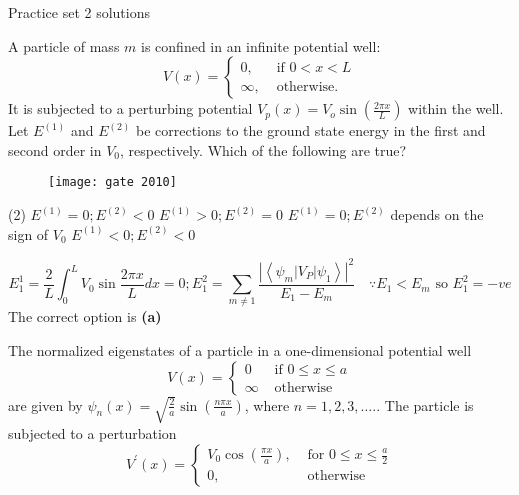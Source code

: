 \newpage
\begin{abox}
	Practice set 2 solutions
	\end{abox}
\begin{enumerate}
	\begin{minipage}{\textwidth}
		\item A particle of mass $m$ is confined in an infinite potential well:
		$$
		V(x)= \begin{cases}0, & \text { if } 0<x<L \\ \infty, & \text { otherwise. }\end{cases}
		$$
		It is subjected to a perturbing potential $V_{p}(x)=V_{o} \sin \left(\frac{2 \pi x}{L}\right)$ within the well. Let $E^{(1)}$ and $E^{(2)}$ be corrections to the ground state energy in the first and second order in $V_{0}$, respectively. Which of the following are true?
		\begin{figure}[H]
			\centering
			\texttt{[image: gate 2010]}
		\end{figure}
	\end{minipage}
	\begin{tasks}(2)
		\task[\textbf{A.}]$E^{(1)}=0 ; E^{(2)}<0$
		\task[\textbf{B.}]$E^{(1)}>0 ; E^{(2)}=0$
		\task[\textbf{C.}]$E^{(1)}=0 ; E^{(2)}$ depends on the sign of $V_{0}$
		\task[\textbf{D.}]$E^{(1)}<0 ; E^{(2)}<0$
	\end{tasks}
	\begin{answer}
		$$E_{1}^{1}=\frac{2}{L} \int_{0}^{L} V_{0} \sin \frac{2 \pi x}{L} d x=0 ; E_{1}^{2}=\sum_{m \neq 1} \frac{\left|\left\langle\psi_{m}\left|V_{P}\right| \psi_{1}\right\rangle\right|^{2}}{E_{1}-E_{m}} \quad \because E_{1}<E_{m} \text { so } E_{1}^{2}=-v e$$
		The correct option is \textbf{(a)}
	\end{answer}
	\begin{minipage}{\textwidth}
		\item The normalized eigenstates of a particle in a one-dimensional potential well
		$$
		V(x)= \begin{cases}0 & \text { if } 0 \leq x \leq a \\ \infty & \text { otherwise }\end{cases}
		$$
		are given by $\psi_{n}(x)=\sqrt{\frac{2}{a}} \sin \left(\frac{n \pi x}{a}\right)$, where $n=1,2,3, \ldots . .$
		The particle is subjected to a perturbation
		$$
		V^{\prime}(x)= \begin{cases}V_{0} \cos \left(\frac{\pi x}{a}\right), & \text { for } 0 \leq x \leq \frac{a}{2} \\ 0, & \text { otherwise }\end{cases}
$$
\end{minipage}
\end{enumerate}
